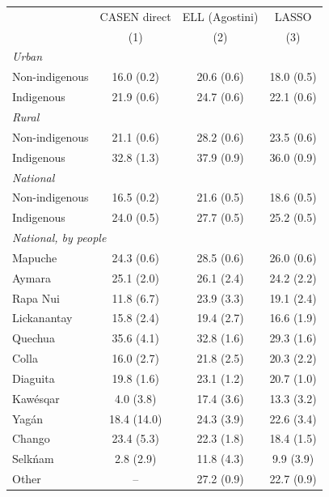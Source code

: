 \begin{tabular}{lccc}
\toprule
 & CASEN direct & ELL (Agostini) & LASSO \\
 & (1) & (2) & (3) \\
\midrule
\multicolumn{4}{l}{\textit{Urban}} \\
\quad Non-indigenous & 16.0 (0.2) & 20.6 (0.6) & 18.0 (0.5) \\
\quad Indigenous & 21.9 (0.6) & 24.7 (0.6) & 22.1 (0.6) \\
\multicolumn{4}{l}{\textit{Rural}} \\
\quad Non-indigenous & 21.1 (0.6) & 28.2 (0.6) & 23.5 (0.6) \\
\quad Indigenous & 32.8 (1.3) & 37.9 (0.9) & 36.0 (0.9) \\
\multicolumn{4}{l}{\textit{National}} \\
\quad Non-indigenous & 16.5 (0.2) & 21.6 (0.5) & 18.6 (0.5) \\
\quad Indigenous & 24.0 (0.5) & 27.7 (0.5) & 25.2 (0.5) \\
\multicolumn{4}{l}{\textit{National, by people}} \\
\quad Mapuche & 24.3 (0.6) & 28.5 (0.6) & 26.0 (0.6) \\
\quad Aymara & 25.1 (2.0) & 26.1 (2.4) & 24.2 (2.2) \\
\quad Rapa Nui & 11.8 (6.7) & 23.9 (3.3) & 19.1 (2.4) \\
\quad Lickanantay & 15.8 (2.4) & 19.4 (2.7) & 16.6 (1.9) \\
\quad Quechua & 35.6 (4.1) & 32.8 (1.6) & 29.3 (1.6) \\
\quad Colla & 16.0 (2.7) & 21.8 (2.5) & 20.3 (2.2) \\
\quad Diaguita & 19.8 (1.6) & 23.1 (1.2) & 20.7 (1.0) \\
\quad Kaw\'esqar & 4.0 (3.8) & 17.4 (3.6) & 13.3 (3.2) \\
\quad Yag\'an & 18.4 (14.0) & 24.3 (3.9) & 22.6 (3.4) \\
\quad Chango & 23.4 (5.3) & 22.3 (1.8) & 18.4 (1.5) \\
\quad Selk\'nam & 2.8 (2.9) & 11.8 (4.3) & 9.9 (3.9) \\
\quad Other & -- & 27.2 (0.9) & 22.7 (0.9) \\
\bottomrule
\end{tabular}
